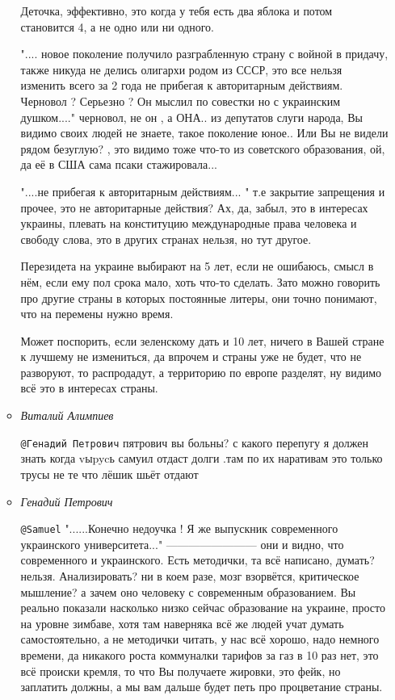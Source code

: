 \begin{itemize}
\begin{itemize}
Деточка, эффективно, это когда у тебя есть два яблока и потом становится 4, а
не одно или ни одного.

".... новое поколение получило разграбленную страну с войной в придачу, также
никуда не делись олигархи родом из СССР, это все нельзя изменить всего за 2
года не прибегая к авторитарным действиям. Черновол ? Серьезно ? Он мыслил по
совестки но с украинским душком...."  черновол, не он , а ОНА.. из депутатов
слуги народа, Вы видимо своих людей не знаете, такое поколение юное.. Или Вы
не видели рядом безуглую? , это видимо тоже что-то из советского образования,
ой, да её в США сама псаки стажировала...

"....не прибегая к авторитарным действиям... " т.е закрытие запрещения и
прочее, это не авторитарные действия? Ах, да, забыл, это в интересах украины,
плевать на конституцию международные права человека и свободу слова, это в
других странах нельзя, но тут другое.

Перезидета на украине выбирают на 5 лет, если не ошибаюсь, смысл в нём, если
ему пол срока мало, хоть что-то сделать. Зато можно говорить про другие страны
в которых постоянные литеры, они точно понимают, что на перемены нужно время.

Может поспорить, если зеленскому дать и 10 лет, ничего в Вашей стране к лучшему
не измениться, да впрочем и страны уже не будет, что не разворуют, то
распродадут, а территорию по европе разделят, ну видимо всё это в интересах
страны.

\item \emph{Виталий Алимпиев}

\verb|@Генадий Петрович| пятрович вы больны? с какого перепугу я должен знать когда
vыpycь самуил отдаст долги .там по их наративам это только трусы не те что
лёшик шьёт отдают

\item \emph{Генадий Петрович}

\verb|@Samuel|  "......Конечно недоучка ! Я же выпускник современного
украинского университета..." ------------------------ они и видно, что
современного и украинского. Есть методички, та всё написано, думать? нельзя.
Анализировать? ни в коем разе, мозг взорвётся, критическое мышление? а зачем
оно человеку с современным образованием. Вы реально показали насколько низко
сейчас образование на украине, просто на уровне зимбаве, хотя там наверняка
всё же людей учат думать самостоятельно, а не методички читать, у нас всё
хорошо, надо немного времени, да никакого роста коммуналки тарифов за газ в 10
раз нет, это всё происки кремля, то что Вы получаете жировки, это фейк, но
заплатить должны, а мы вам дальше будет петь про процветание страны.


\end{itemize}
\end{itemize}
